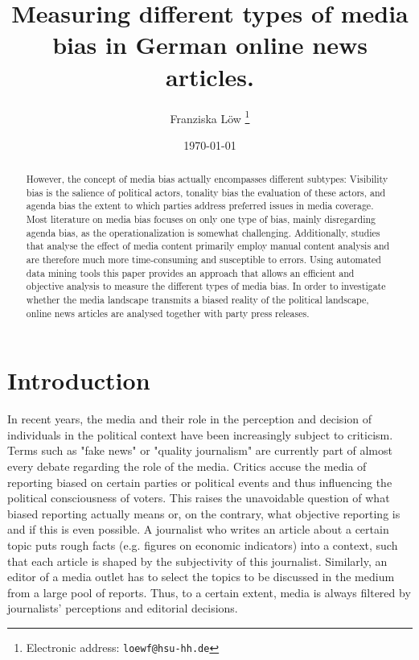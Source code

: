 \documentclass[12pt,a4paper,notitlepage]{article}
\title{Measuring different types of media bias in German online news articles.}
\date{\today}
\author{Franziska Löw
  \thanks{Electronic address: \texttt{loewf@hsu-hh.de}}}
\affil{Department of Industrial Economics,\\ Helmut Schmidt University,\\ Hamburg, Germany}
\begin{document}
\begin{titlepage}
	\maketitle
	\begin{abstract}
	However, the concept of media bias actually encompasses different subtypes: Visibility bias is the salience of political actors, tonality bias the evaluation of these actors, and agenda bias the extent to which parties address preferred issues in media coverage. Most literature on media bias focuses on only one type of bias, mainly disregarding agenda bias, as the operationalization is somewhat challenging. Additionally, studies that analyse the effect of media content primarily employ manual content analysis and are therefore much more time-consuming and susceptible to errors. Using automated data mining tools this paper provides an approach that allows an efficient and objective analysis to measure the different types of media bias. In order to investigate whether the media landscape transmits a biased reality of the political landscape, online news articles are analysed together with party press releases.
	\end{abstract}

\end{titlepage}

\tableofcontents

\pagebreak


\section{Introduction}

In recent years, the media and their role in the perception and decision of individuals in the political context have been increasingly subject to criticism. Terms such as "fake news" or "quality journalism" are currently part of almost every debate regarding the role of the media. Critics accuse the media of reporting biased on certain parties or political events and thus influencing the political consciousness of voters. This raises the unavoidable question of what biased reporting actually means or, on the contrary, what objective reporting is and if this is even possible. A journalist who writes an article about a certain topic puts rough facts (e.g. figures on economic indicators) into a context, such that each article is shaped by the subjectivity of this journalist. Similarly, an editor of a media outlet has to select the topics to be discussed in the medium from a large pool of reports. Thus, to a certain extent, media is always filtered by journalists' perceptions and editorial decisions. 
\end{document}
